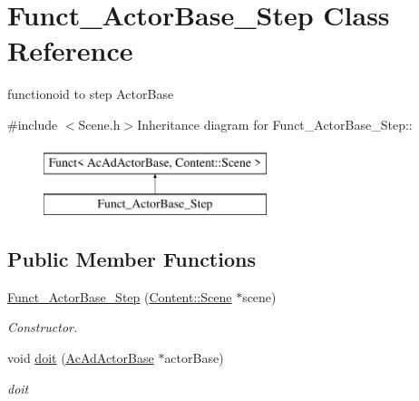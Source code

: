 \hypertarget{classFunct__ActorBase__Step}{
\section{Funct\_\-ActorBase\_\-Step Class Reference}
\label{classFunct__ActorBase__Step}
}


functionoid to step ActorBase  


{\ttfamily \#include $<$Scene.h$>$}Inheritance diagram for Funct\_\-ActorBase\_\-Step::\begin{figure}[H]
\begin{center}
\leavevmode
\includegraphics[height=2cm]{classFunct__ActorBase__Step}
\end{center}
\end{figure}
\subsection*{Public Member Functions}
\begin{DoxyCompactItemize}
\item 
\hypertarget{classFunct__ActorBase__Step_a4c8a3e54e7791b75f86b372afce0d453}{
\hyperlink{classFunct__ActorBase__Step_a4c8a3e54e7791b75f86b372afce0d453}{Funct\_\-ActorBase\_\-Step} (\hyperlink{classContent_1_1Scene}{Content::Scene} $\ast$scene)}
\label{classFunct__ActorBase__Step_a4c8a3e54e7791b75f86b372afce0d453}

\begin{DoxyCompactList}\small\item\em Constructor. \item\end{DoxyCompactList}\item 
\hypertarget{classFunct__ActorBase__Step_a757862f887640b907aadfb7b46ec19eb}{
void \hyperlink{classFunct__ActorBase__Step_a757862f887640b907aadfb7b46ec19eb}{doit} (\hyperlink{classContent_1_1Actor_1_1Admin_1_1ActorBase}{AcAdActorBase} $\ast$actorBase)}
\label{classFunct__ActorBase__Step_a757862f887640b907aadfb7b46ec19eb}

\begin{DoxyCompactList}\small\item\em doit \item\end{DoxyCompactList}\end{DoxyCompactItemize}


